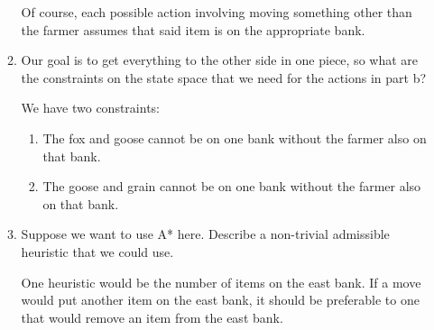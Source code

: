\documentclass[12pt,letterpaper]{article}
\begin{document}
\begin{enumerate}
\begin{enumerate}
          Of course, each possible action involving moving something other than the farmer
          assumes that said item is on the appropriate bank.
        \item
          Our goal is to get everything to the other side in one piece,
          so what are the constraints on the state space that we need for the actions in part b?

          We have two constraints:
          \begin{enumerate}
            \item
              The fox and goose cannot be on one bank without the farmer also on that bank.
            \item
              The goose and grain cannot be on one bank without the farmer also on that bank.
          \end{enumerate}
        \item
          Suppose we want to use A* here.
          Describe a non-trivial admissible heuristic that we could use.

          One heuristic would be the number of items on the east bank.
          If a move would put another item on the east bank,
          it should be preferable to one that would remove an item from the east bank.
      \end{enumerate}
  \end{enumerate}
\end{document}
